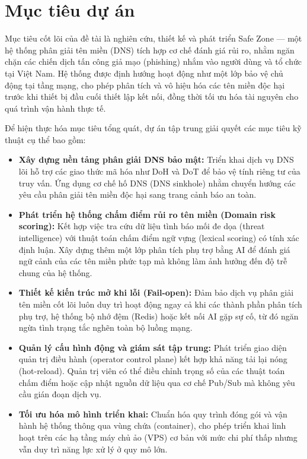 \section{Mục tiêu dự án}

Mục tiêu cốt lõi của đề tài là nghiên cứu, thiết kế và phát triển Safe Zone --- một hệ thống phân giải tên miền (DNS) tích hợp cơ chế đánh giá rủi ro, nhằm ngăn chặn các chiến dịch tấn công giả mạo (phishing) nhắm vào người dùng và tổ chức tại Việt Nam. Hệ thống được định hướng hoạt động như một lớp bảo vệ chủ động tại tầng mạng, cho phép phân tích và vô hiệu hóa các tên miền độc hại trước khi thiết bị đầu cuối thiết lập kết nối, đồng thời tối ưu hóa tài nguyên cho quá trình vận hành thực tế.

Để hiện thực hóa mục tiêu tổng quát, dự án tập trung giải quyết các mục tiêu kỹ thuật cụ thể bao gồm:

\begin{itemize}
    \item \textbf{Xây dựng nền tảng phân giải DNS bảo mật:} Triển khai dịch vụ DNS lõi hỗ trợ các giao thức mã hóa như DoH và DoT để bảo vệ tính riêng tư của truy vấn. Ứng dụng cơ chế hố DNS (DNS sinkhole) nhằm chuyển hướng các yêu cầu phân giải tên miền độc hại sang trang cảnh báo an toàn.
    
    \item \textbf{Phát triển hệ thống chấm điểm rủi ro tên miền (Domain risk scoring):} Kết hợp việc tra cứu dữ liệu tình báo mối đe dọa (threat intelligence) với thuật toán chấm điểm ngữ vựng (lexical scoring) có tính xác định luận. Xây dựng thêm một lớp phân tích phụ trợ bằng AI để đánh giá ngữ cảnh của các tên miền phức tạp mà không làm ảnh hưởng đến độ trễ chung của hệ thống.
    
    \item \textbf{Thiết kế kiến trúc mở khi lỗi (Fail-open):} Đảm bảo dịch vụ phân giải tên miền cốt lõi luôn duy trì hoạt động ngay cả khi các thành phần phân tích phụ trợ, hệ thống bộ nhớ đệm (Redis) hoặc kết nối AI gặp sự cố, từ đó ngăn ngừa tình trạng tắc nghẽn toàn bộ luồng mạng.
    
    \item \textbf{Quản lý cấu hình động và giám sát tập trung:} Phát triển giao diện quản trị điều hành (operator control plane) kết hợp khả năng tải lại nóng (hot-reload). Quản trị viên có thể điều chỉnh trọng số của các thuật toán chấm điểm hoặc cập nhật nguồn dữ liệu qua cơ chế Pub/Sub mà không yêu cầu gián đoạn dịch vụ.
    
    \item \textbf{Tối ưu hóa mô hình triển khai:} Chuẩn hóa quy trình đóng gói và vận hành hệ thống thông qua vùng chứa (container), cho phép triển khai linh hoạt trên các hạ tầng máy chủ ảo (VPS) cơ bản với mức chi phí thấp nhưng vẫn duy trì năng lực xử lý ở quy mô lớn.
\end{itemize}

